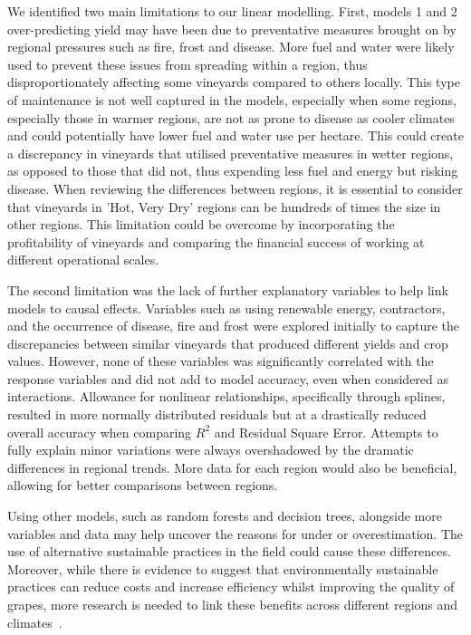\documentclass[10pt,letterpaper]{article}
\begin{document}
\par
We identified two main limitations to our linear modelling. First, models 1 and 2 over-predicting yield may have been due to preventative measures brought on by regional pressures such as fire, frost and disease. More fuel and water were likely used to prevent these issues from spreading within a region, thus disproportionately affecting some vineyards compared to others locally. This type of maintenance is not well captured in the models, especially when some regions, especially those in warmer regions, are not as prone to disease as cooler climates and could potentially have lower fuel and water use per hectare. This could create a discrepancy in vineyards that utilised preventative measures in wetter regions, as opposed to those that did not, thus expending less fuel and energy but risking disease. When reviewing the differences between regions, it is essential to consider that vineyards in 'Hot, Very Dry' regions can be hundreds of times the size in other regions. This limitation could be overcome by incorporating the profitability of vineyards and comparing the financial success of working at different operational scales.
\par
The second limitation was the lack of further explanatory variables to help link models to causal effects. Variables such as using renewable energy, contractors, and the occurrence of disease, fire and frost were explored initially to capture the discrepancies between similar vineyards that produced different yields and crop values. However, none of these variables was significantly correlated with the response variables and did not add to model accuracy, even when considered as interactions. Allowance for nonlinear relationships, specifically through splines, resulted in more normally distributed residuals but at a drastically reduced overall accuracy when comparing $R^2$ and Residual Square Error. Attempts to fully explain minor variations were always overshadowed by the dramatic differences in regional trends. More data for each region would also be beneficial, allowing for better comparisons between regions.
\par
Using other models, such as random forests and decision trees, alongside more variables and data may help uncover the reasons for under or overestimation. The use of alternative sustainable practices in the field could cause these differences. Moreover, while there is evidence to suggest that environmentally sustainable practices can reduce costs and increase efficiency whilst improving the quality of grapes, more research is needed to link these benefits across different regions and climates~\cite{baianoOverviewSustainabilityWine2021,marianiSustainableWinegrowingCurrent2015,montalvo-falconSustainabilityResearchWine2023}.
\end{document}
